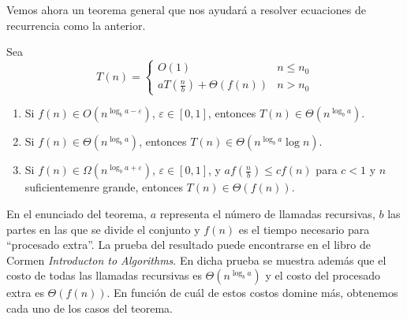 \documentclass[AL.tex]{subfiles}
\begin{document}
Vemos ahora un teorema general que nos ayudará a resolver ecuaciones de recurrencia como la anterior.

\begin{teorema}

Sea $$T(n)=\begin{cases}
O(1) & n\leq n_0\\
aT(\frac{n}{b})+\Theta(f(n)) & n> n_0
\end{cases}$$ 
\begin{enumerate}
\item Si $f(n)\in O(n^{\log_ba-\varepsilon})$, $\varepsilon\in [0,1]$, entonces $T(n)\in\Theta(n^{\log_ba})$.
\item Si $f(n)\in \Theta(n^{\log_ba})$, entonces $T(n)\in\Theta(n^{\log_ba}\log n)$.
\item Si $f(n)\in\Omega(n^{\log_ba+\varepsilon})$, $\varepsilon\in[0,1]$, y $af(\frac{n}{b})\leq cf(n)$ para $c<1$ y $n$ suficientemenre grande, entonces $T(n)\in\Theta(f(n))$. 
\end{enumerate}

\end{teorema}
En el enunciado del teorema, $a$ representa el número de llamadas recursivas, $b$ las partes en las que se divide el conjunto y $f(n)$ es el tiempo necesario para ``procesado extra''. La prueba del resultado puede encontrarse en el libro de Cormen \emph{Introducton to Algorithms}. En dicha prueba se muestra además que el costo de todas las llamadas recursivas es $\Theta(n^{\log_ba})$ y el costo del procesado extra es $\Theta(f(n))$. En función de cuál de estos costos domine más, obtenemos cada uno de los casos del teorema. 
\end{document}
